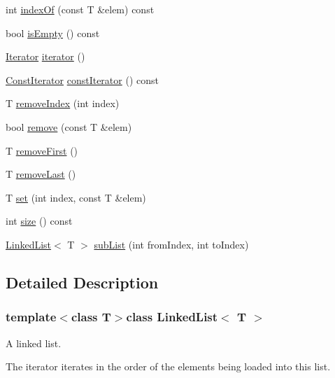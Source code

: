 \begin{DoxyCompactItemize}
\item 
int \hyperlink{class_linked_list_a646dd45a585d1900ade684066d0e481e}{indexOf} (const T \&elem) const 
\item 
bool \hyperlink{class_linked_list_a1b28b1e19e5aa68f3d89352e307928f6}{isEmpty} () const 
\item 
\hyperlink{class_linked_list_1_1_iterator}{Iterator} \hyperlink{class_linked_list_a6304437e7c2bf371965a2e722ecee408}{iterator} ()
\item 
\hyperlink{class_linked_list_1_1_const_iterator}{ConstIterator} \hyperlink{class_linked_list_afa4fb24c30cd90be305291270e1c1d43}{constIterator} () const 
\item 
T \hyperlink{class_linked_list_a932dc97715de110afc96c9ea5739c3da}{removeIndex} (int index)
\item 
bool \hyperlink{class_linked_list_a11920077d4dfb00686249a5ecff12438}{remove} (const T \&elem)
\item 
T \hyperlink{class_linked_list_ac673b58c520de5ef8e3c7dc38699b5bf}{removeFirst} ()
\item 
T \hyperlink{class_linked_list_aaf5239e3fee9b7571b72990df0c9402e}{removeLast} ()
\item 
T \hyperlink{class_linked_list_a9bcd89bb9a2fedac344e6917e15e134e}{set} (int index, const T \&elem)
\item 
int \hyperlink{class_linked_list_a1d41dc6acb9222b8dcef37485fbbf0dd}{size} () const 
\item 
\hyperlink{class_linked_list}{LinkedList}$<$ T $>$ \hyperlink{class_linked_list_a1979ba893435f94d8746aac9623be412}{subList} (int fromIndex, int toIndex)
\end{DoxyCompactItemize}


\subsection{Detailed Description}
\subsubsection*{template$<$class T$>$class LinkedList$<$ T $>$}

A linked list.

The iterator iterates in the order of the elements being loaded into this list. 

